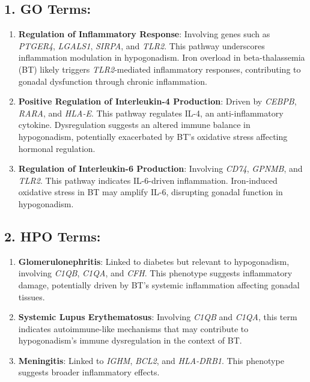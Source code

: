 \subsection*{1. GO Terms:}
\begin{enumerate}
    \item \textbf{Regulation of Inflammatory Response}: Involving genes such as \textit{PTGER4}, \textit{LGALS1}, \textit{SIRPA}, and \textit{TLR2}. This pathway underscores inflammation modulation in hypogonadism. Iron overload in beta-thalassemia (BT) likely triggers \textit{TLR2}-mediated inflammatory responses, contributing to gonadal dysfunction through chronic inflammation.
    
    \item \textbf{Positive Regulation of Interleukin-4 Production}: Driven by \textit{CEBPB}, \textit{RARA}, and \textit{HLA-E}. This pathway regulates IL-4, an anti-inflammatory cytokine. Dysregulation suggests an altered immune balance in hypogonadism, potentially exacerbated by BT's oxidative stress affecting hormonal regulation.
    
    \item \textbf{Regulation of Interleukin-6 Production}: Involving \textit{CD74}, \textit{GPNMB}, and \textit{TLR2}. This pathway indicates IL-6-driven inflammation. Iron-induced oxidative stress in BT may amplify IL-6, disrupting gonadal function in hypogonadism.
\end{enumerate}

\subsection*{2. HPO Terms:}
\begin{enumerate}
    \item \textbf{Glomerulonephritis}: Linked to diabetes but relevant to hypogonadism, involving \textit{C1QB}, \textit{C1QA}, and \textit{CFH}. This phenotype suggests inflammatory damage, potentially driven by BT's systemic inflammation affecting gonadal tissues.
    
    \item \textbf{Systemic Lupus Erythematosus}: Involving \textit{C1QB} and \textit{C1QA}, this term indicates autoimmune-like mechanisms that may contribute to hypogonadism's immune dysregulation in the context of BT.
    
    \item \textbf{Meningitis}: Linked to \textit{IGHM}, \textit{BCL2}, and \textit{HLA-DRB1}. This phenotype suggests broader inflammatory effects.
\end{enumerate}

